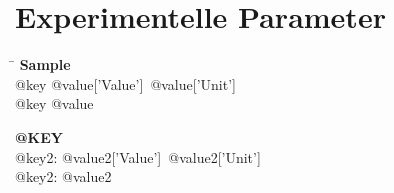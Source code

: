 \documentclass{article}
\begin{document}
\clearpage
\section*{Experimentelle Parameter}

\begin{minipage}{\textwidth}
\begin{tabbing}
\hspace{3.5cm} \= \kill
\textbf{Sample}\\
		{@key} \> {@value['Value']}~{@value['Unit']}
		\\
		{@key} \> {@value}
		\\
\end{tabbing}
\end{minipage}
	
\begin{multicols}{2}

	\begin{minipage}{.49\textwidth}
	\textbf{{@KEY}}\\
			{@key2}: {@value2['Value']}~{@value2['Unit']}
			\\
			{@key2}: {@value2}
			\\
	\end{minipage}
\end{multicols}
\end{document}

